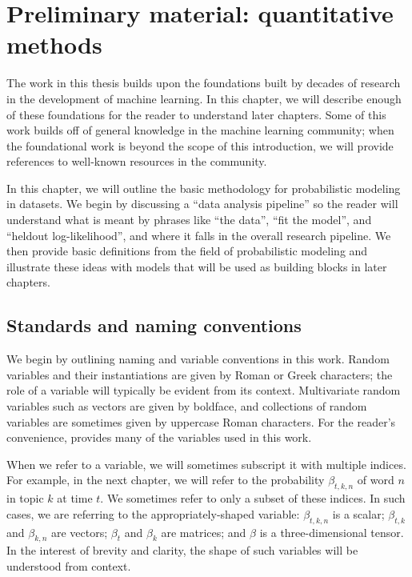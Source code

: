 \chapter{Preliminary material: quantitative methods}
\label{chapter:introductory_material}

The work in this thesis builds upon the foundations built by decades
of research in the development of machine learning.  In this chapter,
we will describe enough of these foundations for the reader to
understand later chapters. Some of this work builds off of general
knowledge in the machine learning community; when the foundational
work is beyond the scope of this introduction, we will provide
references to well-known resources in the community.

In this chapter, we will outline the basic methodology for
probabilistic modeling in datasets.  We begin by discussing a ``data
analysis pipeline'' so the reader will understand what is meant by
phrases like ``the data'', ``fit the model'', and ``heldout
log-likelihood'', and where it falls in the overall research pipeline.
We then provide basic definitions from the field of probabilistic
modeling and illustrate these ideas with models that will be used as
building blocks in later chapters.

\section{Standards and naming conventions}
We begin by outlining naming and variable conventions in this work.
Random variables and their instantiations are given by Roman or Greek
characters; the role of a variable will typically be evident from its
context.  Multivariate random variables such as vectors are given by
boldface, and collections of random variables are sometimes given by
uppercase Roman characters.  For the reader's convenience,
 provides many of the variables used in this work.

When we refer to a variable, we will sometimes subscript it with
multiple indices.  For example, in the next chapter, we will refer to
the probability $\beta_{t,k,n}$ of word $n$ in topic $k$ at time
$t$. We sometimes refer to only a subset of these indices. In such
cases, we are referring to the appropriately-shaped variable:
$\beta_{t,k,n}$ is a scalar; $\beta_{t,k}$ and $\beta_{k,n}$ are
vectors; $\beta_t$ and $\beta_k$ are matrices; and
$\beta$ is a three-dimensional tensor.  In the interest of brevity and
clarity, the shape of such variables will be understood from context.

